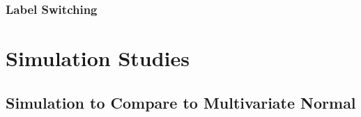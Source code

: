 \documentclass[useAMS,referee]{biom}
\begin{document}
\subsubsection{Label Switching}

\newpage

\section{Simulation Studies}
\label{s:sim}

\subsection{Simulation to Compare to Multivariate Normal}

\begin{table}[t]


\end{table}
\end{document}
